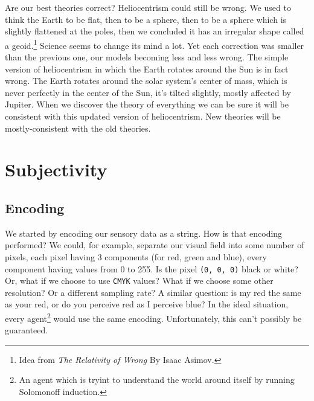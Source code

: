 \documentclass[oneside,hidelinks]{article}
\begin{document}
Are our best theories correct?
Heliocentrism could still be wrong.
We used to think the Earth to be flat, then to be a sphere, then to be a sphere which is slightly flattened at the poles, then we concluded it has an irregular shape called a geoid.\footnote{
Idea from \textit{The Relativity of Wrong} By Isaac Asimov.
}
Science seems to change its mind a lot.
Yet each correction was smaller than the previous one, our models becoming less and less wrong.
The simple version of heliocentrism in which the Earth rotates around the Sun is in fact wrong.
The Earth rotates around the solar system's center of mass, which is never perfectly in the center of the Sun, it's tilted slightly, mostly affected by Jupiter.
When we discover the theory of everything we can be sure it will be consistent with this updated version of heliocentrism.
New theories will be mostly-consistent with the old theories.

\newpage

\section{Subjectivity}

\subsection{Encoding}

We started by encoding our sensory data as a string.
How is that encoding performed?
We could, for example, separate our visual field into some number of pixels, each pixel having 3 components (for red, green and blue), every component having values from 0 to 255.
Is the pixel \texttt{(0, 0, 0)} black or white?
Or, what if we choose to use \texttt{CMYK} values?
What if we choose some other resolution?
Or a different sampling rate?
A similar question: is my red the same as your red, or do you perceive red as I perceive blue?
In the ideal situation, every agent\footnote{
An agent which is tryint to understand the world around itself by running Solomonoff induction.
}
would use the same encoding.
Unfortunately, this can't possibly be guaranteed.
\end{document}
